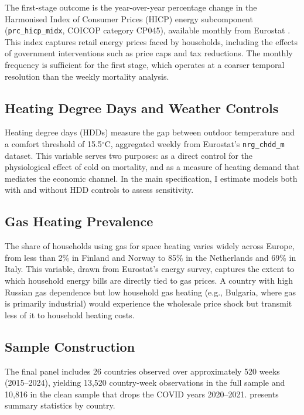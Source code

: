 \documentclass[12pt]{article}
\begin{document}
The first-stage outcome is the year-over-year percentage change in the Harmonised Index of Consumer Prices (HICP) energy subcomponent (\texttt{prc\_hicp\_midx}, COICOP category CP045), available monthly from Eurostat \citep{destatis2023}. This index captures retail energy prices faced by households, including the effects of government interventions such as price caps and tax reductions. The monthly frequency is sufficient for the first stage, which operates at a coarser temporal resolution than the weekly mortality analysis.

\subsection{Heating Degree Days and Weather Controls}

Heating degree days (HDDs) measure the gap between outdoor temperature and a comfort threshold of 15.5$^{\circ}$C, aggregated weekly from Eurostat's \texttt{nrg\_chdd\_m} dataset. This variable serves two purposes: as a direct control for the physiological effect of cold on mortality, and as a measure of heating demand that mediates the economic channel. In the main specification, I estimate models both with and without HDD controls to assess sensitivity.

\subsection{Gas Heating Prevalence}

The share of households using gas for space heating varies widely across Europe, from less than 2\% in Finland and Norway to 85\% in the Netherlands and 69\% in Italy. This variable, drawn from Eurostat's energy survey, captures the extent to which household energy bills are directly tied to gas prices. A country with high Russian gas dependence but low household gas heating (e.g., Bulgaria, where gas is primarily industrial) would experience the wholesale price shock but transmit less of it to household heating costs.

\subsection{Sample Construction}

The final panel includes 26 countries observed over approximately 520 weeks (2015--2024), yielding 13,520 country-week observations in the full sample and 10,816 in the clean sample that drops the COVID years 2020--2021.  presents summary statistics by country.
\end{document}
